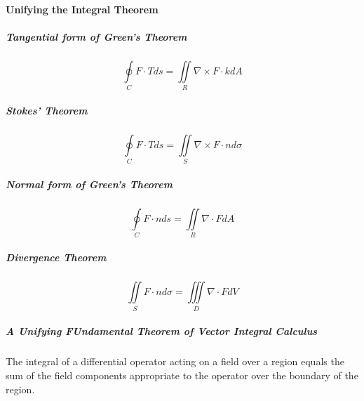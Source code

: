 \documentclass{article}
\begin{document}
            \paragraph{Unifying the Integral Theorem}
                \subparagraph{Tangential form of Green's Theorem}
                    \[\oint\limits_C F\cdot Tds=\iint\limits_R\nabla\times F\cdot kdA\]
                \subparagraph{Stokes' Theorem}
                    \[\oint\limits_CF\cdot Tds=\iint\limits_S\nabla\times F\cdot n d\sigma\]
                \subparagraph{Normal form of Green's Theorem}
                    \[\oint\limits_CF\cdot nds=\iint\limits_R\nabla\cdot FdA\]
                \subparagraph{Divergence Theorem}
                    \[\iint\limits_SF\cdot nd\sigma=\iiint\limits_D\nabla\cdot FdV\]
                \subparagraph{A Unifying FUndamental Theorem of Vector Integral Calculus}
                The integral of a differential operator acting on a field over a region equals the sum of the field components appropriate to the operator over the boundary of the region.
\end{document}
